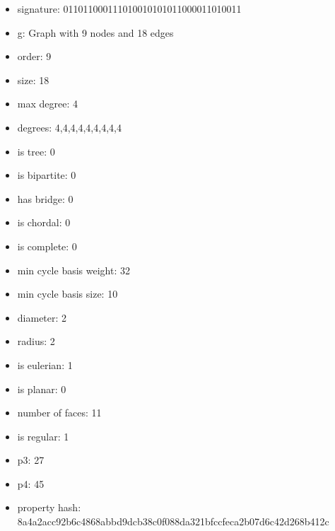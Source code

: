 \newpage
\begin{figure}
\end{figure}
\begin{itemize}
\item signature: 011011000111010010101011000011010011
\item g: Graph with 9 nodes and 18 edges
\item order: 9
\item size: 18
\item max degree: 4
\item degrees: 4,4,4,4,4,4,4,4,4
\item is tree: 0
\item is bipartite: 0
\item has bridge: 0
\item is chordal: 0
\item is complete: 0
\item min cycle basis weight: 32
\item min cycle basis size: 10
\item diameter: 2
\item radius: 2
\item is eulerian: 1
\item is planar: 0
\item number of faces: 11
\item is regular: 1
\item p3: 27
\item p4: 45
\item property hash: 8a4a2acc92b6c4868abbd9dcb38c0f088da321bfccfeca2b07d6c42d268b412c
\end{itemize}
